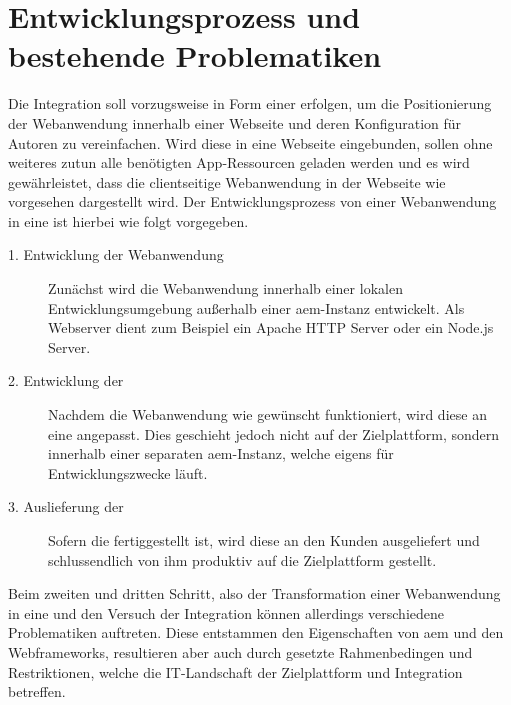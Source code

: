 \section{Entwicklungsprozess und bestehende Problematiken}
Die Integration soll vorzugsweise in Form einer \ajc erfolgen, um die Positionierung der Webanwendung innerhalb einer Webseite und deren Konfiguration für Autoren zu vereinfachen. Wird diese in eine Webseite eingebunden, sollen ohne weiteres zutun alle benötigten App-Ressourcen geladen werden und es wird gewährleistet, dass die clientseitige Webanwendung in der Webseite wie vorgesehen dargestellt wird. Der Entwicklungsprozess von einer Webanwendung in eine \ajc ist hierbei wie folgt vorgegeben.

\begin{description}
	\item[1. Entwicklung der Webanwendung] Zunächst wird die Webanwendung innerhalb einer lokalen Entwicklungsumgebung außerhalb einer \ac{aem}-Instanz entwickelt. Als Webserver dient zum Beispiel ein Apache HTTP Server oder ein Node.js Server.
	\item[2. Entwicklung der \ajc] Nachdem die Webanwendung wie gewünscht funktioniert, wird diese an eine \ajc angepasst. Dies geschieht jedoch nicht auf der Zielplattform, sondern innerhalb einer separaten \ac{aem}-Instanz, welche eigens für Entwicklungszwecke läuft.
	\item[3. Auslieferung der \ajc] Sofern die \ajc fertiggestellt ist, wird diese an den Kunden ausgeliefert und schlussendlich von ihm produktiv auf die Zielplattform gestellt.
\end{description}



Beim zweiten und dritten Schritt, also der Transformation einer Webanwendung in eine \ajc und den Versuch der Integration können allerdings verschiedene Problematiken auftreten. Diese entstammen den Eigenschaften von \ac{aem} und den Webframeworks, resultieren aber auch durch gesetzte Rahmenbedingen und Restriktionen, welche die IT-Landschaft der Zielplattform und Integration betreffen. 




